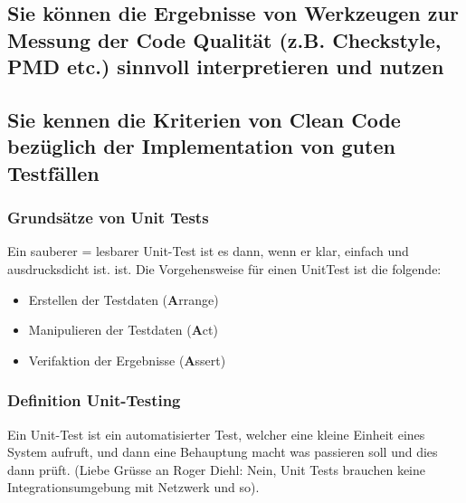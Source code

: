 \subsection{Sie können die Ergebnisse von Werkzeugen zur Messung der Code Qualität (z.B. Checkstyle, PMD etc.) sinnvoll interpretieren und nutzen}

\subsection{Sie kennen die Kriterien von Clean Code bezüglich der Implementation von guten Testfällen}
\subsubsection{Grundsätze von Unit Tests}
Ein sauberer = lesbarer Unit-Test ist es dann, wenn er klar, einfach und ausdrucksdicht ist.
ist. Die Vorgehensweise für einen UnitTest ist die folgende:
\begin{itemize}
  \item Erstellen der Testdaten (\textbf{A}rrange)
  \item Manipulieren der Testdaten (\textbf{A}ct)
  \item Verifaktion der Ergebnisse (\textbf{A}ssert)
\end{itemize}

\subsubsection{Definition Unit-Testing}
Ein Unit-Test ist ein automatisierter Test, welcher eine kleine Einheit eines System aufruft, und dann eine Behauptung macht was passieren soll und dies dann prüft. (Liebe Grüsse an Roger Diehl: Nein, Unit Tests brauchen keine Integrationsumgebung mit Netzwerk und so).
